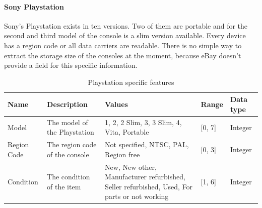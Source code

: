 \paragraph{Sony Playstation}
Sony's Playstation exists in ten versions. Two of them are portable and for the second and third model of the console is a slim version available. Every device has a region code or all data carriers are readable. There is no simple way to extract the storage size of the consoles at the moment, because eBay doesn't provide a field for this specific information.
\begin{table}[h!]
	\begin{center}
	\begin{tabular}{| p{2.6cm} | p{2.6cm} | p{2.6cm} | p{2.6cm} | p{2.6cm} |}
		\hline
		Name & Description & Values & Range & Data type \\
		\hline
		Model & The model of the Playstation & 1, 2, 2 Slim, 3, 3 Slim, 4, Vita, Portable & [0, 7] & Integer \\
		\hline
		Region Code & The region code of the console & Not specified, NTSC, PAL, Region free & [0, 3] & Integer \\
		\hline
		Condition & The condition of the item & New, New other, Manufacturer refurbished, Seller refurbished, Used, For parts or not working & [1, 6] & Integer \\
		\hline
	\end{tabular}
	\end{center}
	\caption{Playstation specific features}
\end{table}

